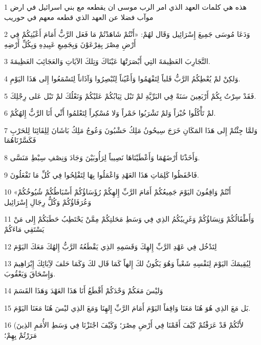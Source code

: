 \par 1 هذه هي كلمات العهد الذي امر الرب موسى ان يقطعه مع بني اسرائيل في ارض موآب فضلا عن العهد الذي قطعه معهم في حوريب
\par 2 وَدَعَا مُوسَى جَمِيعَ إِسْرَائِيل وَقَال لهُمْ: «أَنْتُمْ شَاهَدْتُمْ مَا فَعَل الرَّبُّ أَمَامَ أَعْيُنِكُمْ فِي أَرْضِ مِصْرَ بِفِرْعَوْنَ وَبِجَمِيعِ عَبِيدِهِ وَبِكُلِّ أَرْضِهِ
\par 3 التَّجَارِبَ العَظِيمَةَ التِي أَبْصَرَتْهَا عَيْنَاكَ وَتِلكَ الآيَاتِ وَالعَجَائِبَ العَظِيمَةَ.
\par 4 وَلكِنْ لمْ يُعْطِكُمُ الرَّبُّ قَلباً لِتَفْهَمُوا وَأَعْيُناً لِتُبْصِرُوا وَآذَاناً لِتَسْمَعُوا إِلى هَذَا اليَوْمِ.
\par 5 فَقَدْ سِرْتُ بِكُمْ أَرْبَعِينَ سَنَةً فِي البَرِّيَّةِ لمْ تَبْل ثِيَابُكُمْ عَليْكُمْ وَنَعْلُكَ لمْ تَبْل عَلى رِجْلِكَ.
\par 6 لمْ تَأْكُلُوا خُبْزاً وَلمْ تَشْرَبُوا خَمْراً وَلا مُسْكِراً لِتَعْلمُوا أَنِّي أَنَا الرَّبُّ إِلهُكُمْ.
\par 7 وَلمَّا جِئْتُمْ إِلى هَذَا المَكَانِ خَرَجَ سِيحُونُ مَلِكُ حَشْبُونَ وَعُوجُ مَلِكُ بَاشَانَ لِلِقَائِنَا لِلحَرْبِ فَكَسَّرْنَاهُمَا
\par 8 وَأَخَذْنَا أَرْضَهُمَا وَأَعْطَيْنَاهَا نَصِيباً لِرَأُوبَيْنَ وَجَادَ وَنِصْفِ سِبْطِ مَنَسَّى.
\par 9 فَاحْفَظُوا كَلِمَاتِ هَذَا العَهْدِ وَاعْمَلُوا بِهَا لِتَفْلِحُوا فِي كُلِّ مَا تَفْعَلُونَ.
\par 10 «أَنْتُمْ وَاقِفُونَ اليَوْمَ جَمِيعُكُمْ أَمَامَ الرَّبِّ إِلهِكُمْ رُؤَسَاؤُكُمْ أَسْبَاطُكُمْ شُيُوخُكُمْ وَعُرَفَاؤُكُمْ وَكُلُّ رِجَالِ إِسْرَائِيل
\par 11 وَأَطْفَالُكُمْ وَنِسَاؤُكُمْ وَغَرِيبُكُمُ الذِي فِي وَسَطِ مَحَلتِكُمْ مِمَّنْ يَحْتَطِبُ حَطَبَكُمْ إِلى مَنْ يَسْتَقِي مَاءَكُمْ
\par 12 لِتَدْخُل فِي عَهْدِ الرَّبِّ إِلهِكَ وَقَسَمِهِ الذِي يَقْطَعُهُ الرَّبُّ إِلهُكَ مَعَكَ اليَوْمَ
\par 13 لِيُقِيمَكَ اليَوْمَ لِنَفْسِهِ شَعْباً وَهُوَ يَكُونُ لكَ إِلهاً كَمَا قَال لكَ وَكَمَا حَلفَ لآِبَائِكَ إِبْرَاهِيمَ وَإِسْحَاقَ وَيَعْقُوبَ.
\par 14 وَليْسَ مَعَكُمْ وَحْدَكُمْ أَقْطَعُ أَنَا هَذَا العَهْدَ وَهَذَا القَسَمَ
\par 15 بَل مَعَ الذِي هُوَ هُنَا مَعَنَا وَاقِفاً اليَوْمَ أَمَامَ الرَّبِّ إِلهِنَا وَمَعَ الذِي ليْسَ هُنَا مَعَنَا اليَوْمَ.
\par 16 (لأَنَّكُمْ قَدْ عَرَفْتُمْ كَيْفَ أَقَمْنَا فِي أَرْضِ مِصْرَ؛ وَكَيْفَ اجْتَزْنَا فِي وَسَطِ الأُمَمِ الذِينَ مَرَرْتُمْ بِهِمْ؛
